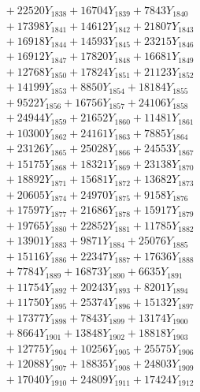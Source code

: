 \documentclass[a4paper,10pt]{article}
\begin{document}
{\begin{align}
&\;  + 22520 Y_{1838} + 16704 Y_{1839} + 7843 Y_{1840} \\[0.3ex]
&\;  + 17398 Y_{1841} + 14612 Y_{1842} + 21807 Y_{1843} \\[0.3ex]
&\;  + 16918 Y_{1844} + 14593 Y_{1845} + 23215 Y_{1846} \\[0.3ex]
&\;  + 16912 Y_{1847} + 17820 Y_{1848} + 16681 Y_{1849} \\[0.3ex]
&\;  + 12768 Y_{1850} + 17824 Y_{1851} + 21123 Y_{1852} \\[0.3ex]
&\;  + 14199 Y_{1853} + 8850 Y_{1854} + 18184 Y_{1855} \\[0.3ex]
&\;  + 9522 Y_{1856} + 16756 Y_{1857} + 24106 Y_{1858} \\[0.5ex]\allowbreak
&\;  + 24944 Y_{1859} + 21652 Y_{1860} + 11481 Y_{1861} \\[0.3ex]
&\;  + 10300 Y_{1862} + 24161 Y_{1863} + 7885 Y_{1864} \\[0.3ex]
&\;  + 23126 Y_{1865} + 25028 Y_{1866} + 24553 Y_{1867} \\[0.3ex]
&\;  + 15175 Y_{1868} + 18321 Y_{1869} + 23138 Y_{1870} \\[0.3ex]
&\;  + 18892 Y_{1871} + 15681 Y_{1872} + 13682 Y_{1873} \\[0.3ex]
&\;  + 20605 Y_{1874} + 24970 Y_{1875} + 9158 Y_{1876} \\[0.3ex]
&\;  + 17597 Y_{1877} + 21686 Y_{1878} + 15917 Y_{1879} \\[0.3ex]
&\;  + 19765 Y_{1880} + 22852 Y_{1881} + 11785 Y_{1882} \\[0.3ex]
&\;  + 13901 Y_{1883} + 9871 Y_{1884} + 25076 Y_{1885} \\[0.3ex]
&\;  + 15116 Y_{1886} + 22347 Y_{1887} + 17636 Y_{1888} \\[0.5ex]\allowbreak
&\;  + 7784 Y_{1889} + 16873 Y_{1890} + 6635 Y_{1891} \\[0.3ex]
&\;  + 11754 Y_{1892} + 20243 Y_{1893} + 8201 Y_{1894} \\[0.3ex]
&\;  + 11750 Y_{1895} + 25374 Y_{1896} + 15132 Y_{1897} \\[0.3ex]
&\;  + 17377 Y_{1898} + 7843 Y_{1899} + 13174 Y_{1900} \\[0.3ex]
&\;  + 8664 Y_{1901} + 13848 Y_{1902} + 18818 Y_{1903} \\[0.3ex]
&\;  + 12775 Y_{1904} + 10256 Y_{1905} + 25575 Y_{1906} \\[0.3ex]
&\;  + 12088 Y_{1907} + 18835 Y_{1908} + 24803 Y_{1909} \\[0.3ex]
&\;  + 17040 Y_{1910} + 24809 Y_{1911} + 17424 Y_{1912} \\[0.3ex]

\end{align}}
\end{document}
